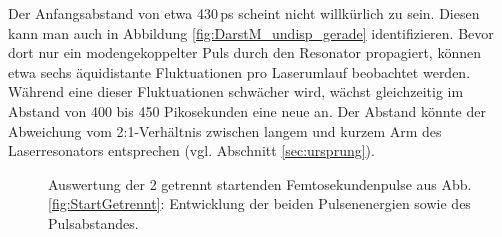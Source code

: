 \documentclass[bachelor,       %
               twoside,        %
               BCOR10mm,       %
               liststotoc,nomtotoc,bibtotoc, %
               english,ngerman, %
               final,          %
               ]{GAUBM}
\begin{document}
Der Anfangsabstand von etwa 430\,ps scheint nicht willkürlich zu sein.
Diesen kann man auch in Abbildung \ref{fig:DarstM_undisp_gerade} identifizieren.
Bevor dort nur ein modengekoppelter Puls durch den Resonator propagiert, können etwa sechs äquidistante Fluktuationen pro Laserumlauf beobachtet werden.
Während eine dieser Fluktuationen schwächer wird, wächst gleichzeitig im Abstand von 400 bis 450 Pikosekunden eine neue an.
Der Abstand könnte der Abweichung vom 2:1-Verhältnis zwischen langem und kurzem Arm des Laserresonators entsprechen (vgl. Abschnitt \ref{sec:ursprung}).

\begin{figure}[!htb]
   \centering
   \hfill
   \caption{Auswertung der 2 getrennt startenden Femtosekundenpulse aus Abb. \ref{fig:StartGetrennt}: Entwicklung der beiden Pulsenenergien sowie des Pulsabstandes.}
   \label{fig:StartGetrenntAusw}
\end{figure}
\end{document}
